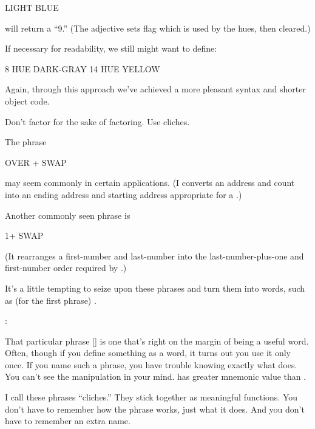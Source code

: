 \begin{Code}
LIGHT BLUE
\end{Code}
will return a ``9.'' (The adjective  sets flag which is
used by the hues, then cleared.)

\goodbreak
If necessary for readability, we still might want to define:

\begin{Code}
8 HUE DARK-GRAY
14 HUE YELLOW
\end{Code}
Again, through this approach we've achieved a more pleasant syntax and
shorter object code.

\begin{tip}
Don't factor for the sake of factoring. Use cliches.
\end{tip}
The phrase

\begin{Code}
OVER + SWAP
\end{Code}
may seem commonly in certain applications. (I converts an address and
count into an ending address and starting address appropriate for a
.)

Another commonly seen phrase is

\begin{Code}
1+ SWAP
\end{Code}
(It rearranges a first-number and last-number into the
last-number-plus-one and first-number order required by .)

It's a little tempting to seize upon these phrases and turn them into
words, such as (for the first phrase) .

\begin{interview}
:

\begin{tfquot}
That particular phrase [] is one that's right on
the margin of being a useful word. Often, though if you define
something as a word, it turns out you use it only once. If you name
such a phrase, you have trouble knowing exactly what 
does. You can't see the manipulation in your mind.  has greater mnemonic value than .
\end{tfquot}
\end{interview}
I call these phrases ``cliches.'' They stick together as meaningful
functions. You don't have to remember how the phrase works, just what
it does. And you don't have to remember an extra name.

